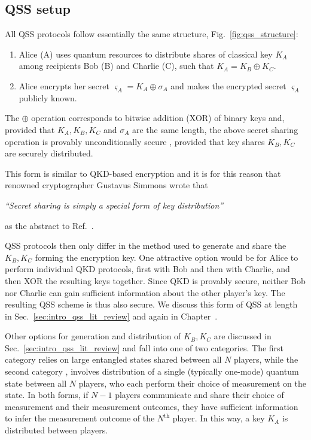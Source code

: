 \subsection{QSS setup}

All QSS protocols follow essentially the same structure, Fig.~\ref{fig:qss_structure}:
\begin{enumerate}
\item Alice (A) uses quantum resources to distribute shares of classical key $K_A$ among recipients Bob (B) and Charlie (C), such that $K_A = K_B \oplus K_C$.
\item Alice encrypts her secret $\varsigma_A = K_A \oplus \sigma_A$ and makes the encrypted secret $\varsigma_A$ publicly known.
\end{enumerate}
The $\oplus$ operation corresponds to bitwise addition (XOR) of binary keys and, provided that $K_A, K_B, K_C$ and $\sigma_A$ are the same length, the above secret sharing operation is provably unconditionally secure \cite{Schneier1996}, provided that key shares $K_B, K_C$ are securely distributed.

This form is similar to QKD-based encryption and it is for this reason that renowned cryptographer Gustavus Simmons wrote that 

\begin{center}\emph{``Secret sharing is simply a special form of key distribution''}\end{center}

\noindent as the abstract to Ref.~\cite{Simmons1990a}.

QSS protocols then only differ in the method used to generate and share the $K_B, K_C$ forming the encryption key. One attractive option would be for Alice to perform individual QKD protocols, first with Bob and then with Charlie, and then XOR the resulting keys together. Since QKD is provably secure, neither Bob nor Charlie can gain sufficient information about the other player's key. The resulting QSS scheme is thus also secure. We discuss this form of QSS at length in Sec.~\ref{sec:intro_qss_lit_review} and again in Chapter~\cite{chapter:aqc}.

Other options for generation and distribution of $K_B, K_C$ are discussed in Sec.~\ref{sec:intro_qss_lit_review} and fall into one of two categories. The first category \cite{Hillery1999, Karlsson1999, Gottesman1999, Markham2008, Wu2016, Kogias2017} relies on large entangled states shared between all $N$ players, while the second category \cite{Zhang2005a, Schmid2005, Schmid2007, Grice2019}, involves distribution of a single (typically one-mode) quantum state between all $N$ players, who each perform their choice of measurement on the state. In both forms, if $N-1$ players communicate and share their choice of measurement and their measurement outcomes, they have sufficient information to infer the measurement outcome of the $N^{\text{th}}$ player. In this way, a key $K_A$ is distributed between players.


